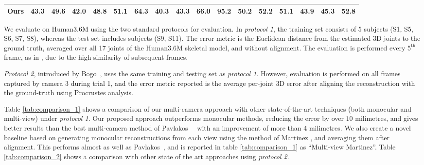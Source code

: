\documentclass[10pt,twocolumn,letterpaper]{article}
\begin{document}
\begin{table*}
{\begin{tabular}{lcccccccccccccccc}
    \textbf{Ours} & \normalsize 43.3 & \normalsize 49.6 & \normalsize \textbf{42.0} & \normalsize 48.8 & \normalsize \textbf{51.1} & \normalsize 64.3 & \normalsize \textbf{40.3} & \normalsize \textbf{43.3} & \normalsize \textbf{66.0} & \normalsize 95.2 & \normalsize
              \textbf{50.2} & \normalsize 52.2 & \normalsize \textbf{51.1} & \normalsize 43.9 & \normalsize 45.3 & \normalsize \textbf{52.8}\\
    \hline
\bottomrule
   \end{tabular}
  }
\caption {Quantitative evaluation on the Human3.6M dataset. We report
   3D pose error results expressed in mm using the metric defined in
   protocol 1. All methods above the first line are monocular while
   those below (~\cite{trumble2017total,pavlakos2017harvesting} and
   {\bf Ours}) are multi-camera approaches.  `'Multi-View Martinez''
   refers to independently reconstructing from each monocular view
   using \cite{martinez2017simple} followed by averaging.
\label{tab:comparison_1}}
\end{table*}


We evaluate on Human3.6M using the two standard protocols for
evaluation. In \emph{protocol 1}, the training set consists of 5
subjects (S1, S5, S6, S7, S8), whereas the test set includes subjects
(S9, S11). The error metric is the Euclidean distance from the
estimated 3D joints to the ground truth, averaged over all 17 joints
of the Human3.6M skeletal model, and without alignment. The evaluation
is performed every $5^\text{th}$ frame, as in
\cite{zhou2016sparseness}, due to the high similarity of subsequent
frames.

\emph{Protocol 2}, introduced by \mbox{Bogo \etal \cite{bogo2016keep}}, uses
the same training and testing set as \emph{protocol 1}. However, evaluation
is performed on all frames captured by camera 3 during trial 1, and the error
metric reported is the average per-joint 3D error after aligning the
reconstruction with the ground-truth using Procrustes
analysis. 


Table \ref{tab:comparison_1} shows a comparison of our multi-camera
approach with other state-of-the-art techniques (both monocular and
multi-view) under \emph{protocol 1}. Our proposed approach outperforms
monocular methods, reducing the error by over $10$ milimetres, and
gives better results than the best multi-camera method of
Pavlakos~\etal~\cite{pavlakos2017harvesting} with an improvement of
more than $4$ milimetres. We also create a novel baseline based on
generating monocular reconstructions from each view using the method
of Martinez \etal \cite{martinez2017simple}, and averaging them after
alignment. This performs almost as well as Pavlakos~\etal, and is
reported in table \ref{tab:comparison_1} as ``Multi-view Martinez''.
Table \ref{tab:comparison_2} shows a comparison with other state of
the art approaches using \emph{protocol 2}.
\end{document}
